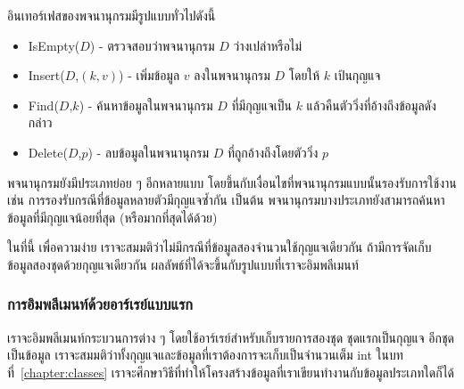 อิน{\wbr}เทอร์เฟส{\wbr}ของ{\wbr}พจนานุกรม{\wbr}มี{\wbr}รูปแบบ{\wbr}ทั่วไป{\wbr}ดังนี้{\wbr}
\begin{itemize}
\item IsEmpty($D$) - ตรวจสอบ{\wbr}ว่า{\wbr}พจนานุกรม $D$ ว่างเปล่า{\wbr}หรือ{\wbr}ไม่{\wbr}
\item Insert($D$,$(k,v)$) - เพิ่ม{\wbr}ข้อมูล $v$ ลง{\wbr}ใน{\wbr}พจนานุกรม $D$ โดย{\wbr}ให้ $k$ เป้{\wbr}น{\wbr}กุญแจ{\wbr}
\item Find($D$,$k$) - ค้นหา{\wbr}ข้อมูล{\wbr}ใน{\wbr}พจนานุกรม $D$ ที่{\wbr}มี{\wbr}กุญแจ{\wbr}เป็น $k$
  แล้ว{\wbr}คืนตัว{\wbr}วิ่ง{\wbr}ที่{\wbr}อ้าง{\wbr}ถึง{\wbr}ข้อมูล{\wbr}ดังกล่าว{\wbr}
\item Delete($D$,$p$) - ลบ{\wbr}ข้อมูล{\wbr}ใน{\wbr}พจนานุกรม $D$ ที่{\wbr}ถูก{\wbr}อ้าง{\wbr}ถึง{\wbr}โดย{\wbr}ตัว{\wbr}วิ่ง $p$
\end{itemize}

พจนานุกรม{\wbr}ยัง{\wbr}มี{\wbr}ประเภท{\wbr}ย่อย ๆ อีก{\wbr}หลาย{\wbr}แบบ{\wbr}
โดย{\wbr}ขึ้น{\wbr}กับ{\wbr}เงื่อนไข{\wbr}ที่{\wbr}พจนานุกรม{\wbr}แบบ{\wbr}นั้น{\wbr}รองรับ{\wbr}การ{\wbr}ใช้{\wbr}งาน เช่น{\wbr}
การ{\wbr}รองรับ{\wbr}กรณี{\wbr}ที่{\wbr}ข้อมูล{\wbr}หลาย{\wbr}ตัว{\wbr}มี{\wbr}กุญแจ{\wbr}ซ้ำ{\wbr}กัน เป็นต้น{\wbr}
พจนานุกรม{\wbr}บาง{\wbr}ประเภท{\wbr}ยัง{\wbr}สามารถ{\wbr}ค้นหา{\wbr}ข้อมูล{\wbr}ที่{\wbr}มี{\wbr}กุญแจ{\wbr}น้อย{\wbr}ที่สุด (หรือ{\wbr}มาก{\wbr}ที่สุด{\wbr}ได้{\wbr}ด้วย)

ใน{\wbr}ที่นี้ เพื่อ{\wbr}ความ{\wbr}ง่าย เรา{\wbr}จะ{\wbr}สมมติ{\wbr}ว่า{\wbr}ไม่{\wbr}มี{\wbr}กรณี{\wbr}ที่{\wbr}ข้อมูล{\wbr}สอง{\wbr}จำนวน{\wbr}ใช้{\wbr}กุญแจ{\wbr}เดียวกัน{\wbr}
ถ้า{\wbr}มี{\wbr}การ{\wbr}จัด{\wbr}เก็บ{\wbr}ข้อมูล{\wbr}สอง{\wbr}ชุด{\wbr}ด้วย{\wbr}กุญแจ{\wbr}เดียวกัน ผลลัพธ์{\wbr}ที่{\wbr}ได้{\wbr}จะ{\wbr}ขึ้น{\wbr}กับ{\wbr}รูปแบบ{\wbr}ที่{\wbr}เรา{\wbr}จะ{\wbr}อิม{\wbr}พลี{\wbr}เมนท์

\subsubsection{การ{\wbr}อิม{\wbr}พลี{\wbr}เมนท์{\wbr}ด้วย{\wbr}อาร์เรย์{\wbr}แบบ{\wbr}แรก}

เรา{\wbr}จะ{\wbr}อิม{\wbr}พลี{\wbr}เมนท์{\wbr}กระบวนการ{\wbr}ต่าง ๆ โดย{\wbr}ใช้{\wbr}อาร์เรย์{\wbr}สำหรับ{\wbr}เก็บ{\wbr}รายการ{\wbr}สอง{\wbr}ชุด{\wbr}
ชุด{\wbr}แรก{\wbr}เป็น{\wbr}กุญแจ อีก{\wbr}ชุด{\wbr}เป็น{\wbr}ข้อมูล{\wbr}
เรา{\wbr}จะ{\wbr}สมมติ{\wbr}ว่า{\wbr}ทั้ง{\wbr}กุญแจ{\wbr}และ{\wbr}ข้อมูล{\wbr}ที่{\wbr}เรา{\wbr}ต้องการ{\wbr}จะ{\wbr}เก็บ{\wbr}เป็น{\wbr}จำนวนเต็ม {\ct int}
ใน{\wbr}บท{\wbr}ที่~\ref{chapter:classes}
เรา{\wbr}จะ{\wbr}ศึกษา{\wbr}วิธี{\wbr}ที่{\wbr}ทำ{\wbr}ให้{\wbr}โครงสร้าง{\wbr}ข้อมูล{\wbr}ที่{\wbr}เรา{\wbr}เขียน{\wbr}ทำงาน{\wbr}กับ{\wbr}ข้อมูล{\wbr}ประเภท{\wbr}ใด{\wbr}ก็ได้{\wbr}

